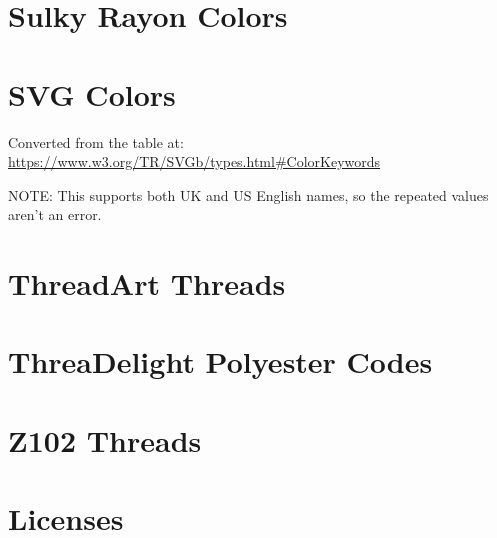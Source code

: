 \documentclass[a4paper]{report}
\begin{document}
\section{Sulky Rayon Colors}

%

\section{SVG Colors}

Converted from the table at:
\url{https://www.w3.org/TR/SVGb/types.html#ColorKeywords}

NOTE: This supports both UK and US English names, so the repeated values aren't
an error.

\section{ThreadArt Threads}

% 

% 

\section{ThreaDelight Polyester Codes}

\section{Z102 Threads}



\section{Licenses}



\printindex
\end{document}
